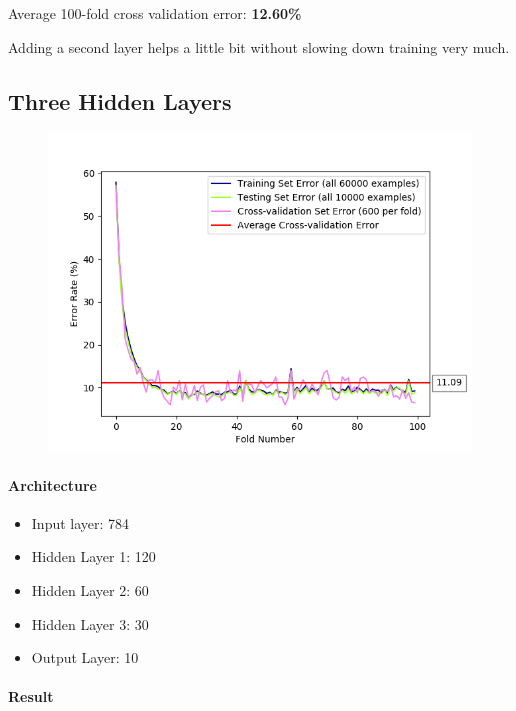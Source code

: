\documentclass[11pt]{article}
\makeatletter
\def\maxwidth{\ifdim\Gin@nat@width>\linewidth\linewidth
    \else\Gin@nat@width\fi}
\let\Oldincludegraphics\includegraphics
\renewcommand{\includegraphics}[1]{\Oldincludegraphics[width=.8\maxwidth]{#1}}
\providecommand{\tightlist}{%
      \setlength{\itemsep}{0pt}\setlength{\parskip}{0pt}}
\makeatother
\begin{document}
Average 100-fold cross validation error: \textbf{12.60\%}

Adding a second layer helps a little bit without slowing down training
very much.

\pagebreak

\subsection{Three Hidden Layers}\label{three-hidden-layers}

\begin{figure}[htbp]
\centering
\includegraphics{plots/ff-numlayers-120-60-30.png}
\end{figure}

\paragraph{Architecture}\label{architecture-3}

\begin{itemize}
\tightlist
\item
  Input layer: 784
\item
  Hidden Layer 1: 120
\item
  Hidden Layer 2: 60
\item
  Hidden Layer 3: 30
\item
  Output Layer: 10
\end{itemize}

\paragraph{Result}\label{result-2}
\end{document}
